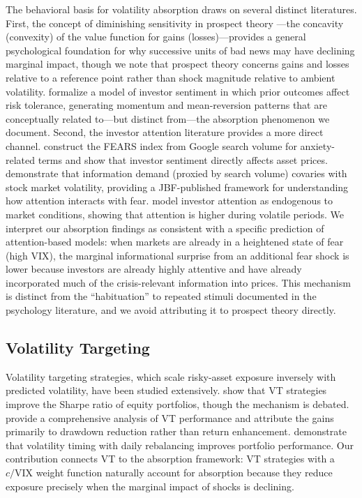 \documentclass[12pt,a4paper]{article}
\begin{document}
The behavioral basis for volatility absorption draws on several distinct literatures. First, the concept of diminishing sensitivity in prospect theory \citep{kahneman1979}---the concavity (convexity) of the value function for gains (losses)---provides a general psychological foundation for why successive units of bad news may have declining marginal impact, though we note that prospect theory concerns gains and losses relative to a reference point rather than shock magnitude relative to ambient volatility. \citet{barberis2001} formalize a model of investor sentiment in which prior outcomes affect risk tolerance, generating momentum and mean-reversion patterns that are conceptually related to---but distinct from---the absorption phenomenon we document. Second, the investor attention literature provides a more direct channel. \citet{da2015} construct the FEARS index from Google search volume for anxiety-related terms and show that investor sentiment directly affects asset prices. \citet{vlastakis2012} demonstrate that information demand (proxied by search volume) covaries with stock market volatility, providing a JBF-published framework for understanding how attention interacts with fear. \citet{andrei2015} model investor attention as endogenous to market conditions, showing that attention is higher during volatile periods. We interpret our absorption findings as consistent with a specific prediction of attention-based models: when markets are already in a heightened state of fear (high VIX), the marginal informational surprise from an additional fear shock is lower because investors are already highly attentive and have already incorporated much of the crisis-relevant information into prices. This mechanism is distinct from the ``habituation'' to repeated stimuli documented in the psychology literature, and we avoid attributing it to prospect theory directly.

\subsection{Volatility Targeting}

Volatility targeting strategies, which scale risky-asset exposure inversely with predicted volatility, have been studied extensively. \citet{moreira2017} show that VT strategies improve the Sharpe ratio of equity portfolios, though the mechanism is debated. \citet{harvey2018} provide a comprehensive analysis of VT performance and attribute the gains primarily to drawdown reduction rather than return enhancement. \citet{fleming2001} demonstrate that volatility timing with daily rebalancing improves portfolio performance. Our contribution connects VT to the absorption framework: VT strategies with a $c/\text{VIX}$ weight function naturally account for absorption because they reduce exposure precisely when the marginal impact of shocks is declining.
\end{document}
